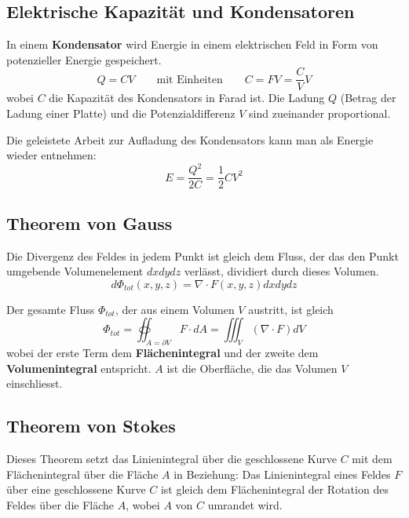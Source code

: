 \documentclass[11pt]{article}
\begin{document}
\subsection{Elektrische Kapazität und Kondensatoren}

In einem \textbf{Kondensator} wird Energie in einem elektrischen Feld in Form von potenzieller Energie gespeichert. 
\begin{equation*}
	Q = CV \qquad\text{mit Einheiten}\qquad C = FV = \frac{C}{V}V
\end{equation*}
wobei $C$ die Kapazität des Kondensators in Farad ist. Die Ladung $Q$ (Betrag der Ladung einer Platte) und die Potenzialdifferenz $V$ sind zueinander proportional. \newline

Die geleistete Arbeit zur Aufladung des Kondensators kann man als Energie wieder entnehmen:
\begin{equation*}
	E = \frac{Q^2}{2C} = \frac{1}{2}CV^2
\end{equation*}

\subsection{Theorem von Gauss}

Die Divergenz des Feldes in jedem Punkt ist gleich dem Fluss, der das den Punkt umgebende Volumenelement $dxdydz$ verlässt, dividiert durch dieses Volumen.
\begin{equation*}
	d\Phi_{tot}(x,y,z) = {\nabla\cdot F(x,y,z)}dxdydz
\end{equation*}

Der gesamte Fluss $\Phi_{tot}$, der aus einem Volumen $V$ austritt, ist gleich
\begin{equation*}
	\Phi_{tot} = \oiint_{A=\partial V}F \cdot dA = \iiint _V(\nabla\cdot F)dV
\end{equation*}
wobei der erste Term dem \textbf{Flächenintegral} und der zweite dem \textbf{Volumenintegral} entspricht. $A$ ist die Oberfläche, die das Volumen $V$ einschliesst.

\subsection{Theorem von Stokes}

Dieses Theorem setzt das Linienintegral über die geschlossene Kurve $C$ mit dem Flächenintegral über die Fläche $A$ in Beziehung: \newline
Das Linienintegral eines Feldes $F$ über eine geschlossene Kurve $C$ ist gleich dem Flächenintegral der Rotation des Feldes über die Fläche $A$, wobei $A$ von $C$ umrandet wird.
\end{document}
